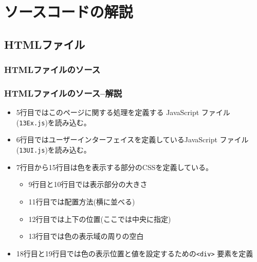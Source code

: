 \section{ソースコードの解説}
\subsection{HTMLファイル}
 \begin{frame}[containsverbatim]
  \frametitle{HTMLファイルのソース}
 \end{frame}
 \begin{frame}[containsverbatim]
  \frametitle{HTMLファイルのソース--解説}
\begin{itemize}
 \item 5行目ではこのページに関する処理を定義する JavaScript ファイル
       (\texttt{13Ex.js})を読み込む。
 \item 6行目ではユーザーインターフェイスを定義しているJavaScript ファイル
       (\texttt{13UI.js})を読み込む。
 \item 7行目から15行目は色を表示する部分のCSSを定義している。
       \begin{itemize}
        \item 9行目と10行目では表示部分の大きさ
        \item 11行目では配置方法(横に並べる)
        \item 12行目では上下の位置(ここでは中央に指定)
        \item 13行目では色の表示域の周りの空白
       \end{itemize}
 \item 18行目と19行目では色の表示位置と値を設定するための\texttt{<div>}
       要素を定義
\end{itemize}
 \end{frame}
